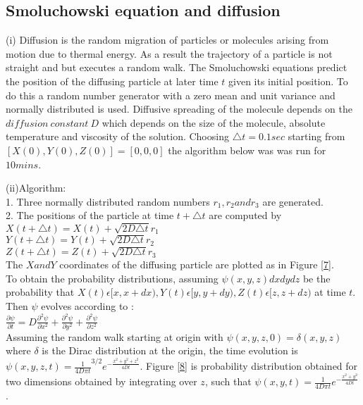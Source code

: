 \documentclass[10 pt]{article}
\begin{document}
\begin{multicols}{2}
\section{Smoluchowski equation and diffusion}
\begin{flushleft}
(i)  Diffusion is the random migration of particles or molecules arising from motion due to thermal energy. As a result the trajectory of a particle is not straight and but executes a random walk. The Smoluchowski equations predict the position of the diffusing particle at later time $t$ given its initial position. To do this a random number generator with a zero mean and unit variance and normally distributed is used. Diffusive spreading of the molecule depends on the $diffusion \: constant \: D$ which depends on the size of the molecule, absolute temperature and viscosity of the solution. Choosing $\triangle t = 0.1 sec$ starting from $[X(0),Y(0),Z(0)] = [0,0,0]$ the algorithm below was was run for $10 mins$.
\end{flushleft}
\begin{flushleft}
(ii)Algorithm:\\
1. Three normally distributed random numbers $r_1, r_2 and r_3$ are generated.\\
2. The positions of the particle at time $t +\triangle t$ are computed by\\
$X(t +\triangle t) = X(t) + \sqrt{2D\triangle t}r_1$\\
$Y(t +\triangle t) = Y(t) + \sqrt{2D\triangle t}r_2$\\
$Z(t +\triangle t) = Z(t) + \sqrt{2D\triangle t}r_3$\\
The $X and Y$ coordinates of the diffusing particle are plotted as in Figure \ref{7}.\\
To obtain the probability distributions, assuming $\psi(x,y,z)dx dy dz$ be the probability that $X(t) \epsilon [x,x+dx), Y(t) \epsilon [y,y+dy), Z(t) \epsilon [z,z+dz)$ at time $t$. Then $\psi$ evolves according to :\\
$\frac {\partial\psi}{\partial t} = D \frac {\partial^2\psi}{\partial x^2} + \frac {\partial^2\psi}{\partial y^2} + \frac {\partial^2\psi}{\partial z^2}$\\
Assuming the random walk starting at origin with $\psi(x,y,z,0) = \delta (x,y,z)$ where $\delta$ is the Dirac distribution at the origin, the time evolution is $\psi (x,y,z,t) = \frac{1}{4D\pi t}^{3/2}e^{-\frac{x^2+y^2+z^2}{4Dt}}$. Figure \ref{8} is probability distribution obtained for two dimensions obtained by integrating over $z$, such that $\psi (x,y,t) = \frac{1}{4D\pi t}e^{-\frac{x^2+y^2}{4Dt}}$.

\end{flushleft}
\end{multicols}
\end{document}
